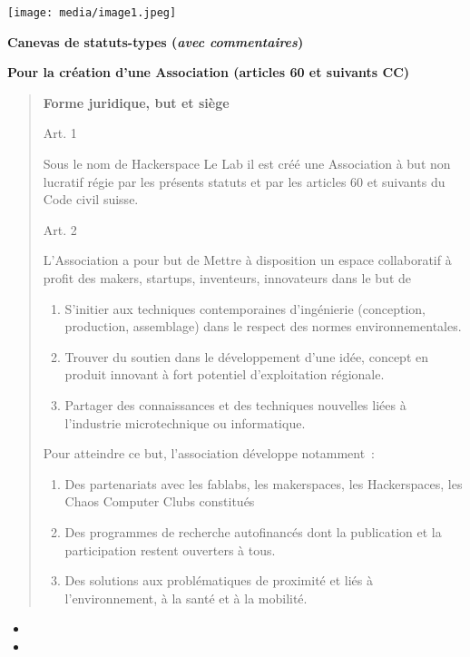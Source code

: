 \documentclass[
]{article}
\author{}
\date{}
\providecommand{\tightlist}{%
  \setlength{\itemsep}{0pt}\setlength{\parskip}{0pt}}
\begin{document}
\texttt{[image: media/image1.jpeg]}

\textbf{Canevas de statuts-types (\emph{avec commentaires})}

\textbf{Pour la création d'une Association (articles 60 et suivants CC)}

\begin{quote}
\textbf{Forme juridique, but et siège}

Art. 1

Sous le nom de Hackerspace Le Lab il est créé une Association à but non lucratif
régie par les présents statuts et par les articles 60 et suivants du
Code civil suisse.

Art. 2

L'Association a pour but de Mettre à disposition un espace collaboratif à profit des makers, startups, inventeurs, innovateurs dans le but de
\begin{enumerate}
  \item S'initier aux techniques contemporaines d'ingénierie (conception, production, assemblage) dans le respect des normes environnementales.
  \item Trouver du soutien dans le développement d'une idée, concept en produit innovant à fort potentiel d'exploitation régionale.
  \item Partager des connaissances et des techniques nouvelles liées à l'industrie microtechnique ou informatique.
\end{enumerate} 

Pour atteindre ce but, l'association développe notamment~:
\begin{enumerate}
  \item Des partenariats avec les fablabs, les makerspaces, les Hackerspaces, les Chaos Computer Clubs constitués
  \item Des programmes de recherche autofinancés dont la publication et la participation restent ouverters à tous.
  \item Des solutions aux problématiques de proximité et liés à l'environnement, à la santé et à la mobilité.
\end{enumerate}
\end{quote}

\begin{itemize}
\tightlist
\item
\item
\end{itemize}
\end{document}
